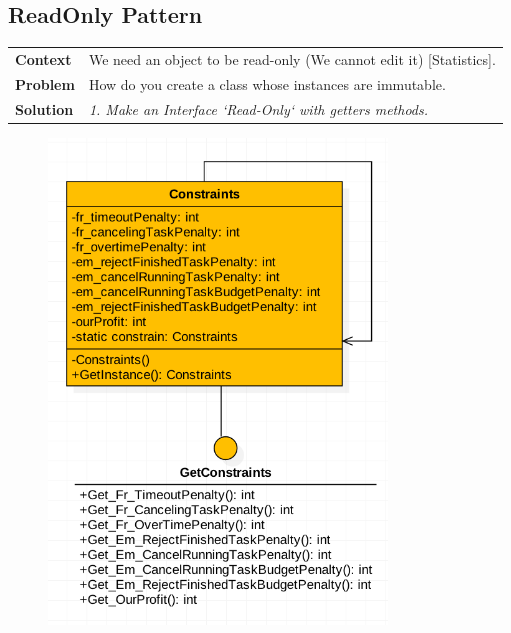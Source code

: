 \documentclass{article}
\begin{document}
\subsection{ReadOnly Pattern}
    \begin{tabular}{ l | l }
    \toprule
      \rowcolor{LightCyan}
      \textbf{Context}            & We need an object to be read-only (We cannot edit it) [Statistics].\\
      \textbf{Problem}            & How do you create a class whose instances are immutable.\\
      \rowcolor{LightCyan}
      \textbf{Solution}           & \textit{1. Make an Interface `Read-Only` with getters methods.}\\
    \toprule
    \end{tabular}
\begin{figure}[ht!]
\centering
\includegraphics[width=90mm]{ReadOnly Design Pattern.png}
\end{figure}


\newpage
\end{document}
